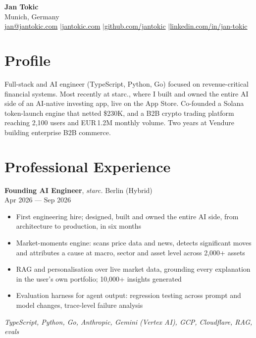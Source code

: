 \documentclass[a4paper,10pt]{article}
\newcommand{\entry}[4]{%
  \textbf{#1}, \textit{#2} \hfill #3 \\ \vspace{-2pt}
  {\small #4}%
}
\begin{document}
\begin{center}
  {\LARGE\bfseries Jan Tokic} \\[2pt]
  Munich, Germany \\[1pt]
  \href{mailto:jan@jantokic.com}{jan@jantokic.com} \enspace$\vert$\enspace \href{https://jantokic.com}{jantokic.com} \enspace$\vert$\enspace \href{https://github.com/jantokic}{github.com/jantokic} \enspace$\vert$\enspace \href{https://linkedin.com/in/jan-tokic}{linkedin.com/in/jan-tokic}
\end{center}

\vspace{-4pt}

\section{Profile}
Full-stack and AI engineer (TypeScript, Python, Go) focused on revenue-critical financial systems. Most recently at starc., where I built and owned the entire AI side of an AI-native investing app, live on the App Store. Co-founded a Solana token-launch engine that netted \$230K, and a B2B crypto trading platform reaching 2,100 users and EUR\,1.2M monthly volume. Two years at Vendure building enterprise B2B commerce.

\section{Professional Experience}

\entry{Founding AI Engineer}{starc.}{Berlin (Hybrid)}{Apr 2026 --- Sep 2026}
\begin{itemize}
  \item First engineering hire; designed, built and owned the entire AI side, from architecture to production, in six months
  \item Market-moments engine: scans price data and news, detects significant moves and attributes a cause at macro, sector and asset level across 2,000+ assets
  \item RAG and personalisation over live market data, grounding every explanation in the user's own portfolio; 10,000+ insights generated
  \item Evaluation harness for agent output: regression testing across prompt and model changes, trace-level failure analysis
\end{itemize}
{\small\textit{TypeScript, Python, Go, Anthropic, Gemini (Vertex AI), GCP, Cloudflare, RAG, evals}}
\end{document}
